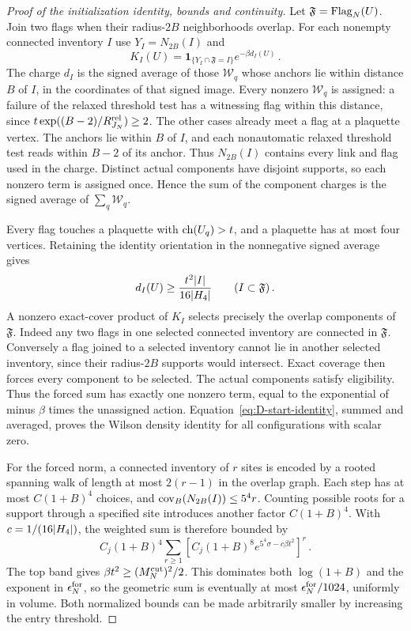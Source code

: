 \begin{proof}[Proof of the initialization identity, bounds and continuity]
Let $\mathfrak F=\operatorname{Flag}_N(U)$. Join two flags when their radius-$2B$ neighborhoods overlap. For each nonempty connected inventory $I$ use $Y_I=N_{2B}(I)$ and
\begin{equation*}
K_I(U)=\mathbf1_{\{Y_I\cap \mathfrak F=I\}}e^{-\beta d_I(U)}\,.
\end{equation*}
The charge $d_I$ is the signed average of those $\mathcal W_q$ whose anchors lie within distance $B$ of $I$, in the coordinates of that signed image. Every nonzero $\mathcal W_q$ is assigned: a failure of the relaxed threshold test has a witnessing flag within this distance, since $t\exp((B-2)/R_{J_N}^{\rm rel})\ge2$. The other cases already meet a flag at a plaquette vertex. The anchors lie within $B$ of $I$, and each nonautomatic relaxed threshold test reads within $B-2$ of its anchor. Thus $N_{2B}(I)$ contains every link and flag used in the charge. Distinct actual components have disjoint supports, so each nonzero term is assigned once. Hence the sum of the component charges is the signed average of $\sum_q\mathcal W_q$.

Every flag touches a plaquette with $\operatorname{ch}(U_q)>t$, and a plaquette has at most four vertices. Retaining the identity orientation in the nonnegative signed average gives
\begin{equation*}
d_I(U)\ge\frac{t^2|I|}{16|H_4|}\qquad(I\subset \mathfrak F)\,.
\end{equation*}
A nonzero exact-cover product of $K_I$ selects precisely the overlap components of $\mathfrak F$. Indeed any two flags in one selected connected inventory are connected in $\mathfrak F$. Conversely a flag joined to a selected inventory cannot lie in another selected inventory, since their radius-$2B$ supports would intersect. Exact coverage then forces every component to be selected. The actual components satisfy eligibility. Thus the forced sum has exactly one nonzero term, equal to the exponential of minus $\beta$ times the unassigned action. Equation~\eqref{eq:D-start-identity}, summed and averaged, proves the Wilson density identity for all configurations with scalar zero.

For the forced norm, a connected inventory of $r$ sites is encoded by a rooted spanning walk of length at most $2(r-1)$ in the overlap graph. Each step has at most $C(1+B)^4$ choices, and $\operatorname{cov}_B(N_{2B}(I))\le5^4r$. Counting possible roots for a support through a specified site introduces another factor $C(1+B)^4$. With $c=1/(16|H_4|)$, the weighted sum is therefore bounded by
\begin{equation*}
C_j(1+B)^4\sum_{r\ge1}
\left[C_j(1+B)^8e^{5^4\sigma-c\beta t^2}\right]^r\,.
\end{equation*}
The top band gives $\beta t^2\ge(M^{\mathrm{cut}}_N)^2/2$. This dominates both $\log(1+B)$ and the exponent in $\epsilon_N^{\rm for}$, so the geometric sum is eventually at most $\epsilon_N^{\rm for}/1024$, uniformly in volume. Both normalized bounds can be made arbitrarily smaller by increasing the entry threshold.


\end{proof}
